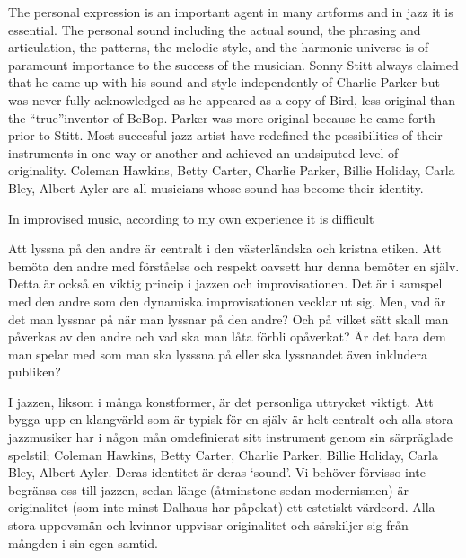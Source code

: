 \documentclass[a4paper]{article}
\begin{document}
The personal expression is an important agent in many artforms and in jazz it is essential. The personal sound including the actual sound, the phrasing and articulation, the patterns, the melodic style, and the harmonic universe is of paramount importance to the success of the musician. Sonny Stitt always claimed that he came up with his sound and style independently of Charlie Parker but was never fully acknowledged as he appeared as a copy of Bird, less original than the ``true''inventor of BeBop. Parker was more original because he came forth prior to Stitt. Most succesful jazz artist have redefined the possibilities of their instruments in one way or another and achieved an undsiputed level of originality. Coleman Hawkins, Betty Carter, Charlie Parker, Billie Holiday, Carla Bley, Albert Ayler are all musicians whose sound has become their identity.

In improvised music, according to my own experience it is difficult 

Att lyssna på den andre är centralt i den västerländska och kristna etiken. Att bemöta den andre med förståelse och respekt oavsett hur denna bemöter en själv. Detta är också en viktig princip i jazzen och improvisationen. Det är i samspel med den andre som den dynamiska improvisationen vecklar ut sig. Men, vad är det man lyssnar på när man lyssnar på den andre? Och på vilket sätt skall man påverkas av den andre och vad ska man låta förbli opåverkat? Är det bara dem man spelar med som man ska lysssna på eller ska lyssnandet även inkludera publiken?

I jazzen, liksom i många konstformer, är det personliga uttrycket viktigt. Att bygga upp en klangvärld som är typisk för en själv är helt centralt och alla stora jazzmusiker har i någon mån omdefinierat sitt instrument genom sin särpräglade spelstil; Coleman Hawkins, Betty Carter, Charlie Parker, Billie Holiday, Carla Bley, Albert Ayler. Deras identitet är deras `sound'. Vi behöver förvisso inte begränsa oss till jazzen, sedan länge (åtminstone sedan modernismen) är originalitet (som inte minst Dalhaus har påpekat) ett estetiskt värdeord. Alla stora uppovsmän och kvinnor uppvisar originalitet och särskiljer sig från mångden i sin egen samtid.
\end{document}
